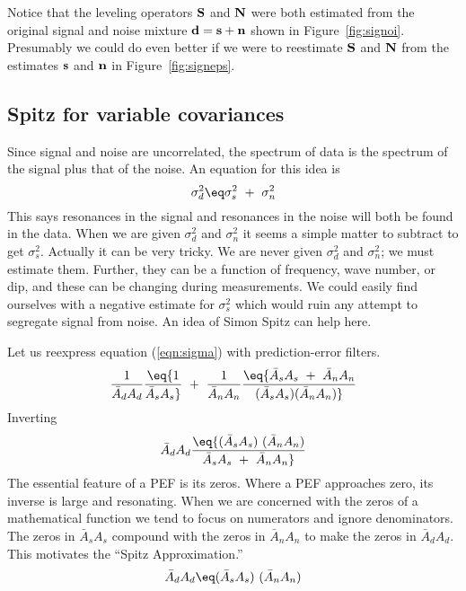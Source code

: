 \par
Notice that the leveling operators
$\bold S$ and $\bold N$ were both estimated
from the original signal and noise mixture
$\bold d = \bold s +\bold n$
shown in Figure~\ref{fig:signoi}.
Presumably we could do even better if we were to reestimate
$\bold S$ and $\bold N$ from the estimates
$\bold s$ and $\bold n$ in Figure~\ref{fig:signeps}.



\subsection{Spitz for variable covariances}
\par
Since signal and noise are uncorrelated,
the spectrum of data is the spectrum of the signal plus that of the noise.
An equation for this idea is
\begin{equation}
\label{eqn:sigma}
\sigma_d^2 \eq 
\sigma_s^2 \ + \ 
\sigma_n^2
\end{equation}
This says resonances in the signal
and resonances in the noise
will both be found in the data.
When we are given $\sigma_d^2$ and $\sigma_n^2$ it seems a simple
matter to subtract to get $\sigma_s^2$.
Actually it can be very tricky.
We are never given $\sigma_d^2$ and $\sigma_n^2$;
we must estimate them.
Further, they can be a function of frequency, wave number, or dip,
and these can be changing during measurements.
We could easily find ourselves with a negative estimate for
$\sigma_s^2$ which would ruin any attempt to segregate signal from noise.
An idea of Simon Spitz can help here.

\par
Let us reexpress equation (\ref{eqn:sigma}) with prediction-error filters.
\begin{equation}
{1\over \bar A_d A_d} \eq
{1\over \bar A_s A_s} \ + \ 
{1\over \bar A_n A_n}
\eq
{
	  {\bar A_s A_s} \ +\  {\bar A_n A_n}
	\over
	( {\bar A_s A_s} )   ( {\bar A_n A_n})
}
\end{equation}
Inverting
\begin{equation}
{ \bar A_d A_d} \eq
{
	( {\bar A_s A_s} ) \  ( {\bar A_n A_n})
	\over
	  {\bar A_s A_s} \ +\  {\bar A_n A_n}
}
\end{equation}
The essential feature of a PEF is its zeros.
Where a PEF approaches zero, its inverse is large and resonating.
When we are concerned with the zeros of a mathematical function
we tend to focus on numerators and ignore denominators.
The zeros in
${\bar A_s A_s}$
compound with the zeros in
${\bar A_n A_n}$
to make the zeros in 
${\bar A_d A_d}$.
This motivates the ``Spitz Approximation.''
\begin{equation}
{ \bar A_d A_d} \eq
	( {\bar A_s A_s} )\   ( {\bar A_n A_n})
\end{equation}

